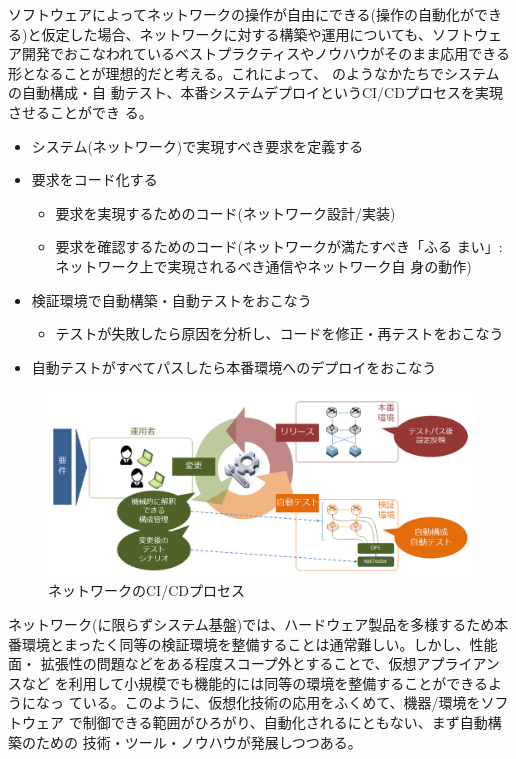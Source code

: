 ソフトウェアによってネットワークの操作が自由にできる(操作の自動化ができ
る)と仮定した場合、ネットワークに対する構築や運用についても、ソフトウェ
ア開発でおこなわれているベストプラクティスやノウハウがそのまま応用できる
形となることが理想的だと考える。これによって、
のようなかたちでシステムの自動構成・自
動テスト、本番システムデプロイというCI/CDプロセスを実現させることができ
る。
\begin{itemize}
 \item システム(ネットワーク)で実現すべき要求を定義する
 \item 要求をコード化する
       \begin{itemize}
        \item 要求を実現するためのコード(ネットワーク設計/実装)
        \item 要求を確認するためのコード(ネットワークが満たすべき「ふる
              まい」: ネットワーク上で実現されるべき通信やネットワーク自
              身の動作)
       \end{itemize}
 \item 検証環境で自動構築・自動テストをおこなう
       \begin{itemize}
        \item テストが失敗したら原因を分析し、コードを修正・再テストをおこなう
       \end{itemize}
 \item 自動テストがすべてパスしたら本番環境へのデプロイをおこなう
\end{itemize}

\begin{figure}[h]
 \centering
 \includegraphics[scale=0.5]{img/desired-cicd-process.png}
 \caption{ネットワークのCI/CDプロセス}
 \label{fig:desired-cicd-process}
\end{figure}

ネットワーク(に限らずシステム基盤)では、ハードウェア製品を多様するため本
番環境とまったく同等の検証環境を整備することは通常難しい。しかし、性能面・
拡張性の問題などをある程度スコープ外とすることで、仮想アプライアンスなど
を利用して小規模でも機能的には同等の環境を整備することができるようになっ
ている。このように、仮想化技術の応用をふくめて、機器/環境をソフトウェア
で制御できる範囲がひろがり、自動化されるにともない、まず自動構築のための
技術・ツール・ノウハウが発展しつつある。

